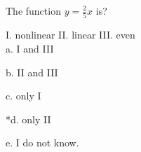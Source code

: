 
The function $y=\frac{2}{5} x$ is?

	I. nonlinear
	II. linear
	III. even \\
	
a. I and III

b. II and III

c.  only I 

*d. only II

e. I do not know. \\
